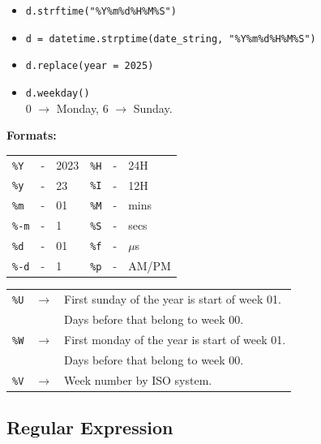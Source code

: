 \begin{itemize}
\item \texttt{d.strftime("\%Y\%m\%d\%H\%M\%S")}
\item \texttt{d = datetime.strptime(date\_string, "\%Y\%m\%d\%H\%M\%S")}
\item \texttt{d.replace(year = 2025)}
\item \texttt{d.weekday()}\\
        0 $\to$ Monday, 6 $\to$ Sunday.\\
\end{itemize}  

\textbf{Formats:}\\
\vspace{2pt}
\begin{tabular}{lcl|lcl}
    \hline
    \texttt{\%Y}  & - & 2023     &   \texttt{\%H}  & - &    24H\\
    \texttt{\%y}  & - & 23       &   \texttt{\%I}  & - &    12H\\
    \texttt{\%m}  & - & 01       &   \texttt{\%M}  & - &    mins\\
    \texttt{\%-m} & - & 1        &   \texttt{\%S}  & - &    secs\\
    \texttt{\%d}  & - & 01       &   \texttt{\%f}  & - &    $\mu$s\\
    \texttt{\%-d} & - & 1        &   \texttt{\%p}  & - &    AM/PM\\
    \hline
\end{tabular} 


\begin{tabularx}{\linewidth}{lcX}
    
\texttt{\%U}    & $\to$ & First sunday of the year is start of week 01.\\
                &       & Days before that belong to week 00.\\ 
\texttt{\%W}    & $\to$ & First monday of the year is start of week 01.\\
                &       & Days before that belong to week 00.\\ 
\texttt{\%V}    & $\to$ & Week number by ISO system.\\

\end{tabularx}


\columnbreak


\subsection{Regular Expression}


